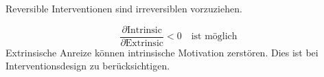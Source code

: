 \begin{axiom}
Reversible Interventionen sind irreversiblen vorzuziehen.
\end{axiom}

\begin{axiom}
\begin{equation}
\frac{\partial \text{Intrinsic}}{\partial \text{Extrinsic}} < 0 \quad \text{ist möglich}
\end{equation}
Extrinsische Anreize können intrinsische Motivation zerstören. Dies ist bei Interventionsdesign zu berücksichtigen.
\end{axiom}

